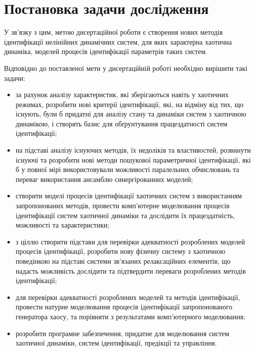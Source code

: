 \section{Постановка задачи дослідження}%



У зв'язку з цим, метою дисертаційної роботи є створення
нових методів ідентифікації нелінійних динамічних систем,
для яких характерна хаотична динаміка,
моделей процесів ідентифікації параметрів таких систем.

Відповідно до поставленої мети у дисертаційній роботі необхідно
вирішити такі задачи:

\begin{itemize}

  \item
    за рахунок аналізу характеристик, які зберігаються навіть
    у хаотичних режимах,
    розробити нові критерії ідентифікації, які, на відміну від тих, що
    існують, були б придатні для аналізу стану та динаміки
    систем з хаотичною динамікою, і створять базис для обґрунтування працездатності систем
    ідентифікації;

  \item
    на підставі аналізу існуючих методів, їх недоліків та властивостей,
    розвинути існуючі та розробити нові методи пошукової параметричної ідентифікації,
    які б у повної мірі використовували можливості
    паралельних обчислювань та переваг використання ансамблю
    синергірованних моделей;


  \item
    створити моделі процесів
    ідентифікації хаотичних систем з використанням запропонованих методів,
    провести комп'ютерне моделювання процесів ідентифікації систем
    хаотичної динаміки та дослідити їх працездатність, можливості та
    характеристики;

  \item
    з ціллю створити підстави для перевірки адекватності розроблених
    моделей процесів ідентифікації,
    розробити нову фізичну систему з хаотичною поведінкою
    на підставі системи зв'язаних релаксаційних елементів,
    що надасть можливість дослідити та підтвердити переваги
    розроблених методів ідентифікації;

  \item
    для перевірки адекватності розроблених моделей та методів ідентифікації,
    провести натурне моделювання процесів ідентифікації запропонованого
    генератора хаосу, та порівняти з результатами комп'ютерного моделювання;

  \item
    розробити програмне забезпечення, придатне для моделювання систем
    хаотичної динаміки, систем ідентифікації, предікції та управління.

\end{itemize}


